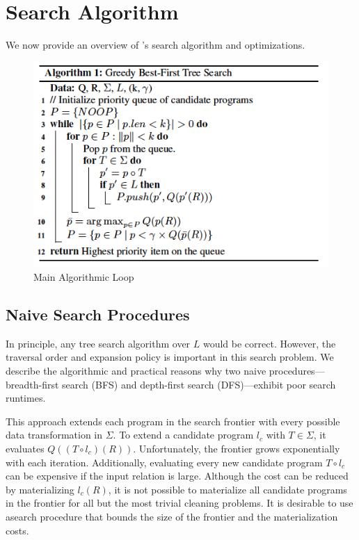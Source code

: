 \section{Search Algorithm}
We now provide an overview of \sys's search algorithm and optimizations.


\begin{figure}[t]
\includegraphics[width=0.8\linewidth]{ac-experiments/ac.png}
\caption{Main Algorithmic Loop \label{alg:main}}
\end{figure}


\subsection*{Naive Search Procedures}
In principle, any tree search algorithm over $L$ would be correct.
However, the traversal order and expansion policy is important in this search problem.  We describe the algorithmic and practical reasons why two naive procedures---breadth-first search (BFS) and depth-first search (DFS)---exhibit poor search runtimes.

 This approach extends each program in the search frontier with every possible data transformation in $\Sigma$.  To extend a candidate program $l_c$ with $T \in \Sigma$, it evaluates $Q((T\circ l_c)(R))$.  Unfortunately, the frontier grows exponentially with each iteration.  Additionally, evaluating every new candidate program $T\circ l_c$ can be expensive if the input relation is large.   Although the cost can be reduced by materializing $l_c(R)$, it is not possible to materialize all candidate programs in the frontier for all but the most trivial cleaning problems.    It is desirable to use asearch procedure that bounds the size of the frontier and the materialization costs.

